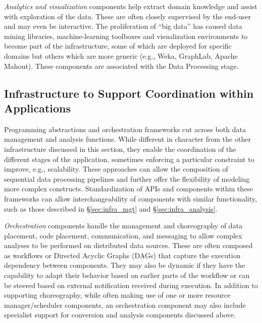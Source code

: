 {\em Analytics and visualization} components help extract domain knowledge and assist with
exploration of the data. These are often closely supervised by the end-user and may even be
interactive. The proliferation of ``big data'' has caused data mining libraries, machine-learning
toolboxes and visualization environments to become part of the infrastructure, some of which are
deployed for specific domains but others which are more generic (e.g., Weka, GraphLab, Apache Mahout). These components are associated
with the Data Processing stage.

\subsection{Infrastructure to Support Coordination within Applications}
\label{sec:infra_coord} 

Programming abstractions and orchestration frameworks cut across both data
management and analysis functions. While different in character from the other
infrastructure discussed in this section, they enable the coordination of the
different stages of the application, sometimes enforcing a particular constraint to improve, e.g., scalability. These approaches can allow the composition of sequential data processing pipelines and further offer the flexibility of modeling more complex constructs. 
Standardization of APIs and components within these frameworks can allow
interchangeability of components with similar functionality, such as those described in \S\ref{sec:infra_mgt} and \S\ref{sec:infra_analysis}.

{\em Orchestration} components handle the management and
choreography of data placement, code placement, communication, and
messaging to allow complex analyses to be performed on distributed
data sources. These are often composed as workflows or Directed Acyclic Graphs (DAGs) that capture
the execution dependency between
components. They may also be dynamic if they have the capability to
adapt their behavior based on earlier parts of the workflow or can be
steered based on external notification received during execution. In
addition to supporting choreography, while often making use of one or more
resource manager/scheduler components, an orchestration component may also
include specialist support for conversion and analysis components
discussed above.

